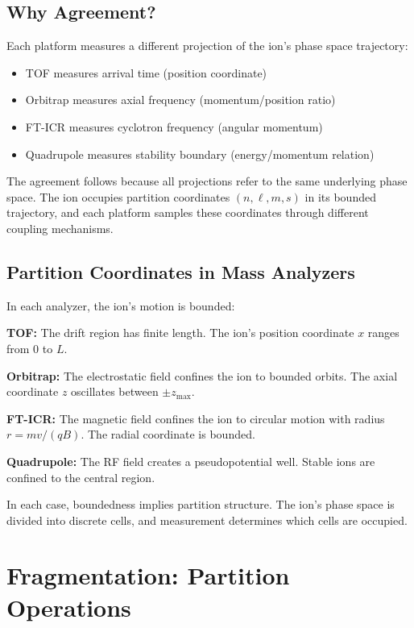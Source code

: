 \documentclass[12pt,a4paper]{article}
\theoremstyle{remark}
\begin{document}
\subsection{Why Agreement?}

Each platform measures a different projection of the ion's phase space trajectory:
\begin{itemize}
    \item TOF measures arrival time (position coordinate)
    \item Orbitrap measures axial frequency (momentum/position ratio)
    \item FT-ICR measures cyclotron frequency (angular momentum)
    \item Quadrupole measures stability boundary (energy/momentum relation)
\end{itemize}

The agreement follows because all projections refer to the same underlying phase space. The ion occupies partition coordinates $(n, \ell, m, s)$ in its bounded trajectory, and each platform samples these coordinates through different coupling mechanisms.

\subsection{Partition Coordinates in Mass Analyzers}

In each analyzer, the ion's motion is bounded:

\textbf{TOF:} The drift region has finite length. The ion's position coordinate $x$ ranges from 0 to $L$.

\textbf{Orbitrap:} The electrostatic field confines the ion to bounded orbits. The axial coordinate $z$ oscillates between $\pm z_{\max}$.

\textbf{FT-ICR:} The magnetic field confines the ion to circular motion with radius $r = mv/(qB)$. The radial coordinate is bounded.

\textbf{Quadrupole:} The RF field creates a pseudopotential well. Stable ions are confined to the central region.

In each case, boundedness implies partition structure. The ion's phase space is divided into discrete cells, and measurement determines which cells are occupied.


\section{Fragmentation: Partition Operations}
\label{sec:fragmentation}
\end{document}
